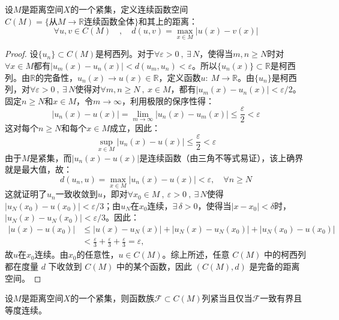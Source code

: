 \begin{definition}[连续函数空间]
设$M$是距离空间$X$的一个紧集，定义连续函数空间$C(M)=\{\text{从}M \to \mathbb{R}\text{连续函数全体}\}$和其上的距离：
\[\forall u,v \in C(M) \quad , \quad d(u,v)=\max_{x \in M}|u(x)-v(x)|\]
\end{definition}
\begin{proof}
设$\{u_n\} \subset C(M)$是柯西列。对于$\forall \varepsilon > 0 \ , \ \exists \, N$，使得当$m,n \ge N$时对$\forall x \in M$都有$|u_m(x)-u_n(x)|<d(u_m,u_n)<\varepsilon$。所以$\{u_n(x)\} \subset \mathbb{R}$是柯西列。由$\mathbb{R}$的完备性，$u_n(x) \to u(x) \in \mathbb{R}$，定义函数$u: \ M\to\mathbb{R}$。由$\{u_n\}$是柯西列，对$\forall \varepsilon>0 \ , \ \exists \, N$使得对$\forall m,n\ge N \ ,  \ x\in M$，都有$|u_m(x)-u_n(x)|<\varepsilon/2$。
固定$n\ge N$和$x\in M$，令$m\to\infty$，利用极限的保序性得：
\[|u_n(x)-u(x)|=\lim_{m\to\infty}|u_n(x)-u_m(x)|\le\frac{\varepsilon}{2}<\varepsilon\]
这对每个$n\ge N$和每个$x\in M$成立，因此：
\[\sup_{x\in M}|u_n(x)-u(x)|\le\frac{\varepsilon}{2}<\varepsilon\]
由于$M$是紧集，而$|u_n(x)-u(x)|$是连续函数（由三角不等式易证），该上确界就是最大值，故：
\[d(u_n,u)=\max_{x\in M}|u_n(x)-u(x)|<\varepsilon,\quad \forall n\ge N\]
这就证明了$u_n$一致收敛到$u$，即对$\forall x_0\in M \ , \ \varepsilon>0 \ , \ \exists \, N$使得$|u_N(x_0)-u(x_0)|<\varepsilon/3$；由$u_N$在$x_0$连续，$\exists \, \delta>0$，使得当$|x-x_0|<\delta$时，$|u_N(x)-u_N(x_0)|<\varepsilon/3$。因此：
\[\begin{aligned}
|u(x)-u(x_0)|
&\le |u(x)-u_N(x)|+|u_N(x)-u_N(x_0)|+|u_N(x_0)-u(x_0)| \\
&< \frac{\varepsilon}{3}+\frac{\varepsilon}{3}+\frac{\varepsilon}{3}=\varepsilon,
\end{aligned}\]
故$u$在$x_0$连续。由$x_0$的任意性，$u\in C(M)$。综上所述，任意 $C(M)$ 中的柯西列都在度量 $d$ 下收敛到 $C(M)$ 中的某个函数，因此 $(C(M),d)$ 是完备的距离空间。
\end{proof}
\begin{theorem}\label{theorem:gaa}
设$M$是距离空间$X$的一个紧集，则函数族$\mathscr{F} \subset C(M)$列紧当且仅当$\mathscr{F}$一致有界且等度连续。
\end{theorem}
